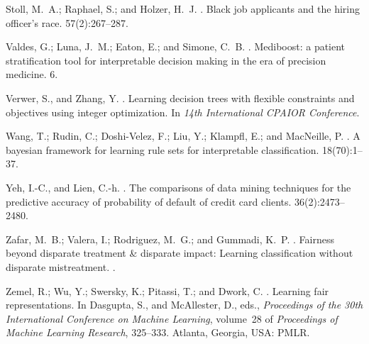 \documentclass[letterpaper]{article} %
\theoremstyle{definition}
\newcommand{\1}{\ensuremath{{\rm e}}} %
\begin{document}
\begin{thebibliography}{}
	Stoll, M.~A.; Raphael, S.; and Holzer, H.~J.
	.
	\newblock Black job applicants and the hiring officer's race.
	 57(2):267--287.
	
	Valdes, G.; Luna, J.~M.; Eaton, E.; and Simone, C.~B.
	.
	\newblock Mediboost: a patient stratification tool for interpretable decision
	making in the era of precision medicine.
	 6.
	
	Verwer, S., and Zhang, Y.
	.
	\newblock Learning decision trees with flexible constraints and objectives
	using integer optimization.
	\newblock In {\em 14th International CPAIOR Conference}.
	
	Wang, T.; Rudin, C.; Doshi-Velez, F.; Liu, Y.; Klampfl, E.; and MacNeille, P.
	.
	\newblock A bayesian framework for learning rule sets for interpretable
	classification.
	 18(70):1--37.
	
	Yeh, I.-C., and Lien, C.-h.
	.
	\newblock The comparisons of data mining techniques for the predictive accuracy
	of probability of default of credit card clients.
	 36(2):2473--2480.
	
	Zafar, M.~B.; Valera, I.; Rodriguez, M.~G.; and Gummadi, K.~P.
	.
	\newblock Fairness beyond disparate treatment \& disparate impact: Learning
	classification without disparate mistreatment.
	.
	
	Zemel, R.; Wu, Y.; Swersky, K.; Pitassi, T.; and Dwork, C.
	.
	\newblock Learning fair representations.
	\newblock In Dasgupta, S., and McAllester, D., eds., {\em Proceedings of the
		30th International Conference on Machine Learning}, volume~28 of {\em
		Proceedings of Machine Learning Research},  325--333.
	\newblock Atlanta, Georgia, USA: PMLR.
	
\end{thebibliography}
\end{document}

